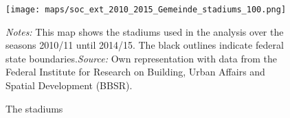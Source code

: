 \vspace*{\fill}
\begin{figure}[H]\centering
	\texttt{[image: maps/soc\_ext\_2010\_2015\_Gemeinde\_stadiums\_100.png]}
	\begin{minipage}{0.95\linewidth}
		\caption{The stadiums}\label{fig_soc_ext:map_gem_stadiums}
		\scriptsize{\emph{Notes:} This map shows the stadiums used in the analysis over the seasons 2010/11 until 2014/15. The black outlines indicate federal state boundaries.\newline \emph{Source:} Own representation with data from the Federal Institute for Research on Building, Urban Affairs and Spatial Development (BBSR).}
	\end{minipage}
\end{figure}
